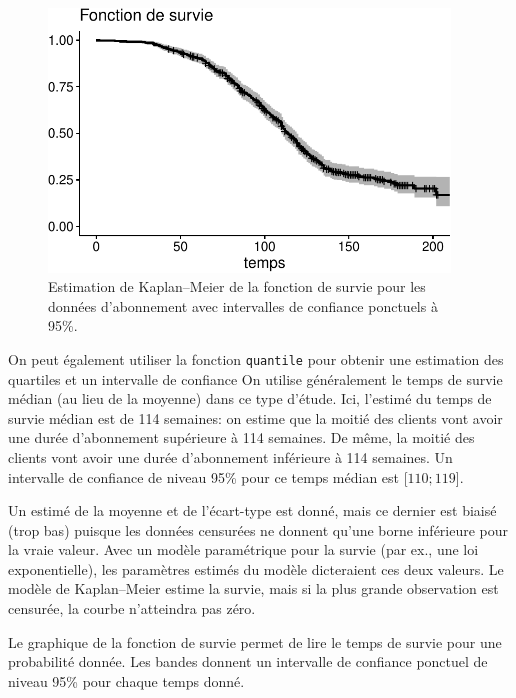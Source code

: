 \documentclass[
  11pt,
  letterpaper,
]{book}
\theoremstyle{definition}
\theoremstyle{remark}
\begin{document}
\begin{figure}[ht!]

{\centering \includegraphics[width=0.95\textwidth,height=\textheight]{./06-survie_files/figure-pdf/fig-km-survie1-1.pdf}

}

\caption{\label{fig-km-survie1}Estimation de Kaplan--Meier de la
fonction de survie pour les données d'abonnement avec intervalles de
confiance ponctuels à 95\%.}

\end{figure}

On peut également utiliser la fonction \texttt{quantile} pour obtenir
une estimation des quartiles et un intervalle de confiance On utilise
généralement le temps de survie médian (au lieu de la moyenne) dans ce
type d'étude. Ici, l'estimé du temps de survie médian est de 114
semaines: on estime que la moitié des clients vont avoir une durée
d'abonnement supérieure à 114 semaines. De même, la moitié des clients
vont avoir une durée d'abonnement inférieure à 114 semaines. Un
intervalle de confiance de niveau 95\% pour ce temps médian est
{[}\(110; 119\){]}.

Un estimé de la moyenne et de l'écart-type est donné, mais ce dernier
est biaisé (trop bas) puisque les données censurées ne donnent qu'une
borne inférieure pour la vraie valeur. Avec un modèle paramétrique pour
la survie (par ex., une loi exponentielle), les paramètres estimés du
modèle dicteraient ces deux valeurs. Le modèle de Kaplan--Meier estime
la survie, mais si la plus grande observation est censurée, la courbe
n'atteindra pas zéro.

Le graphique de la fonction de survie permet de lire le temps de survie
pour une probabilité donnée. Les bandes donnent un intervalle de
confiance ponctuel de niveau 95\% pour chaque temps donné.
\end{document}
